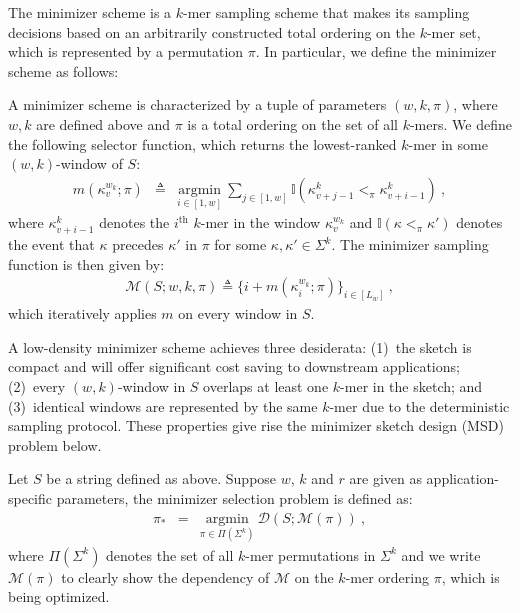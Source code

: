 \noindent The minimizer scheme \cite{schleimer03} is a $k$-mer sampling scheme that makes its sampling decisions based on an arbitrarily constructed total ordering on the $k$-mer set, which is represented by a permutation $\pi$. In particular, we define the minimizer scheme as follows:
\begin{definition}[Minimizer]
\label{c5-def:minimizer}
A minimizer scheme is characterized by a tuple of parameters $(w, k, \pi)$, where $w, k$ are defined above and $\pi$ is a total ordering on the set of all $k$-mers. We define the following selector function, which returns the lowest-ranked $k$-mer in some $(w,k)$-window of $S$: 
\begin{eqnarray}
m(\kappa^{w_k}_v; \pi) &\triangleq&  \underset{i \in [1, w]}{\mathrm{argmin}} \ \sum_{j \in [1,w]} \mathbb{I}(\kappa^k_{v+j-1} <_{\pi} \kappa^k_{v+i-1}) \ ,
\label{c5-eq:minimizer}
\end{eqnarray}
where $\kappa^k_{v+i-1}$ denotes the $i^{\text{th}}$ $k$-mer in the window $\kappa^{w_k}_v$ and $\mathbb{I}(\kappa <_{\pi} \kappa')$ denotes the event that $\kappa$ precedes $\kappa'$ in $\pi$ for some $\kappa,\kappa' \in \Sigma^k$. The minimizer sampling function is then given by:
\begin{eqnarray}
\mathcal{M}(S;w,k,\pi) \triangleq \{i + m(\kappa^{w_k}_i;\pi)\}_{i\in[L_w]} \ ,
\label{eq:mnzsketch}
\end{eqnarray}
which iteratively applies $m$ on every window in $S$.
\end{definition}
 A low-density minimizer scheme achieves three desiderata: (1)~the sketch is compact and will offer significant cost saving to downstream applications; (2)~every $(w,k)$-window in $S$ overlaps at least one $k$-mer in the sketch; and (3)~identical windows are represented by the same $k$-mer due to the deterministic sampling protocol. These properties give rise the minimizer sketch design (MSD) problem below.
\begin{definition}
\label{c5-def:minimizerproblem}
Let $S$ be a string defined as above. Suppose $w$, $k$ and $r$ are given as application-specific parameters, the minimizer selection problem is defined as:
\begin{eqnarray} 
 \pi_\ast &=& \underset{\pi \in \Pi(\Sigma^k)} {\mathrm{argmin}} \ \mathcal{D}(S; \mathcal{M}(\pi)) \ ,
\label{c5-eq:obj}
\end{eqnarray}
where $\Pi(\Sigma^k)$ denotes the set of all $k$-mer permutations in $\Sigma^k$ and we write $\mathcal{M}(\pi)$ to clearly show the dependency of $\mathcal{M}$ on the $k$-mer ordering $\pi$, which is being optimized.
\end{definition} 

